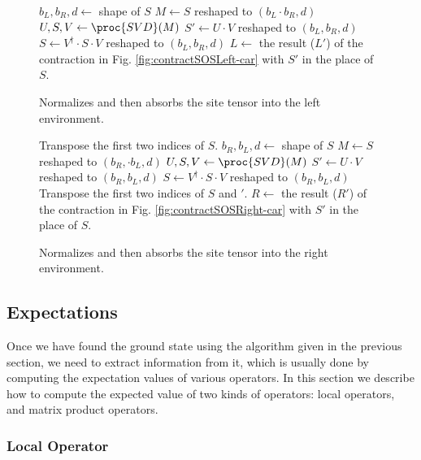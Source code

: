 \documentclass{article}
\begin{document}
\begin{figure}
\begin{codebox}
\li $b_L, b_R, d \gets $ shape of $S$
\li $M \gets S$ reshaped to $(b_L\cdot b_R, d)$
\li $U, S, V \gets \proc{SVD}(M)$
\li $S' \gets U\cdot V$ reshaped to $(b_L,b_R, d)$
\li $S \gets V^\dagger \cdot S \cdot V$ reshaped to $(b_L,b_R, d)$
\li $L \gets $ the result ($L'$) of the contraction in Fig. \ref{fig:contractSOSLeft-car} with $S'$ in the place of $S$.
\end{codebox}
\caption{\label{code:Absorb-Site-Left} Normalizes and then absorbs the site tensor into the left environment.}
\end{figure}

\begin{figure}
\begin{codebox}
\li Transpose the first two indices of $S$.
\li $b_R, b_L, d \gets $ shape of $S$
\li $M \gets S$ reshaped to $(b_R,\cdot b_L, d)$
\li $U, S, V \gets \proc{SVD}(M)$
\li $S' \gets U\cdot V$ reshaped to $(b_R,b_L, d)$
\li $S \gets V^\dagger \cdot S \cdot V$ reshaped to $(b_R,b_L, d)$
\li Transpose the first two indices of $S$ and $'$.
\li $R \gets $ the result ($R'$) of the contraction in Fig. \ref{fig:contractSOSRight-car} with $S'$ in the place of $S$.
\end{codebox}
\caption{\label{code:Absorb-Site-Right} Normalizes and then absorbs the site tensor into the right environment.}
\end{figure}

\subsection{Expectations}

Once we have found the ground state using the algorithm given in the previous section, we need to extract information from it, which is usually done by computing the expectation values of various operators.  In this section we describe how to compute the expected value of two kinds of operators:  local operators, and matrix product operators.

\subsubsection{Local Operator}
\end{document}

